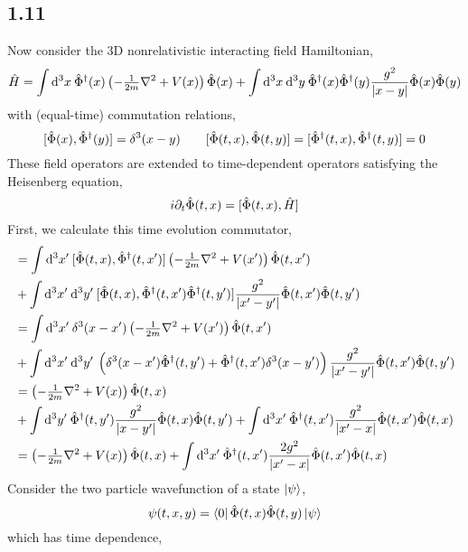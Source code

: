 \documentclass[12pt]{extarticle}
\begin{document}
\subsection*{1.11}
Now consider the 3D nonrelativistic interacting field Hamiltonian,
\[ \hat{H} = \int \mathrm{d}^3x \: \hat{\Phi}^\dagger(x) \left( -\tfrac{1}{2m} \nabla^2 + V(x)\right) \hat{\Phi}(x) + \int \mathrm{d}^3x \: \mathrm{d}^3y \: \hat{\Phi}^\dagger(x) \hat{\Phi}^\dagger(y) \frac{g^2}{|x - y|} \hat{\Phi}(x) \hat{\Phi}(y) \]
with (equal-time) commutation relations,
\[[\hat{\Phi}(x), \hat{\Phi}^\dagger(y)] = \delta^3(x - y) \quad \quad [\hat{\Phi}(t, x), \hat{\Phi}(t, y)] = [\hat{\Phi}^\dagger(t, x), \hat{\Phi}^\dagger(t, y)] = 0\]
These field operators are extended to time-dependent operators satisfying the Heisenberg equation,
\[ i \partial_t \hat{\Phi}(t, x) = [\hat{\Phi}(t, x), \hat{H}] \]
First, we calculate this time evolution commutator,
\begin{align*}
[\field(t, x), \hamilt] & = \int \d{^3 x'} [\field(t, x), \dfield(t, x')] \left( -\tfrac{1}{2m} \nabla^2 + V(x')\right) \field(t, x') 
\\
& + \int \d{^3x'} \d{^3y'} [\field(t, x), \dfield(t, x') \dfield(t, y')] \frac{g^2}{|x' - y'|} \field(t, x') \field(t, y')
\\
& = \int \d{^3 x'} \delta^3(x - x') \left( -\tfrac{1}{2m} \nabla^2 + V(x')\right) \field(t, x')
\\
& + \int \d{^3x'} \d{^3y'} \left( \delta^3(x - x') \dfield(t, y') + \dfield(t, x') \delta^3(x - y') \right) \frac{g^2}{|x' - y'|} \field(t, x') \field(t, y')
\\
& = \left( -\tfrac{1}{2m} \nabla^2 + V(x)\right) \field(t, x)
\\
& + \int \d{^3y'} \dfield(t, y') \frac{g^2}{|x - y'|} \field(t, x) \field(t, y') + \int \d{^3x'}  \dfield(t, x') \frac{g^2}{|x' - x|} \field(t, x') \field(t, x)
\\
& = \left( -\tfrac{1}{2m} \nabla^2 + V(x)\right) \field(t, x) + \int \d{^3x'}  \dfield(t, x') \frac{2 g^2}{|x' - x|} \field(t, x') \field(t, x)
\end{align*}
Consider the two particle wavefunction of a state $\left| \psi \right>$,
\[ \psi(t, x, y) = \left< 0 \right| \hat{\Phi}(t, x) \hat{\Phi}(t, y) \left| \psi \right> \]
which has time dependence,
\end{document}
